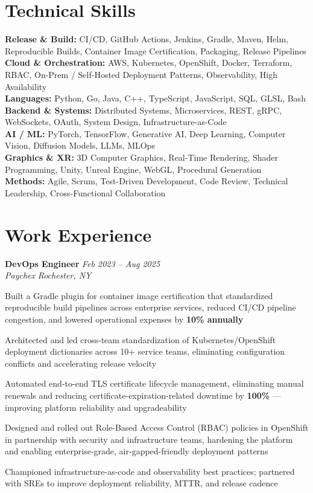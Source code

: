 \documentclass[letterpaper,10pt]{article}
\newcommand{\role}[4]{%
  \textbf{#1} \hfill \textit{#3}\\[-1pt]
  \textit{#2} \hfill \textit{#4}\par\vspace{2pt}
}
\begin{document}
\section*{Technical Skills}
\textbf{Release \& Build:} CI/CD, GitHub Actions, Jenkins, Gradle, Maven, Helm, Reproducible Builds, Container Image Certification, Packaging, Release Pipelines\\
\textbf{Cloud \& Orchestration:} AWS, Kubernetes, OpenShift, Docker, Terraform, RBAC, On-Prem / Self-Hosted Deployment Patterns, Observability, High Availability\\
\textbf{Languages:} Python, Go, Java, C++, TypeScript, JavaScript, SQL, GLSL, Bash\\
\textbf{Backend \& Systems:} Distributed Systems, Microservices, REST, gRPC, WebSockets, OAuth, System Design, Infrastructure-as-Code\\
\textbf{AI / ML:} PyTorch, TensorFlow, Generative AI, Deep Learning, Computer Vision, Diffusion Models, LLMs, MLOps\\
\textbf{Graphics \& XR:} 3D Computer Graphics, Real-Time Rendering, Shader Programming, Unity, Unreal Engine, WebGL, Procedural Generation\\
\textbf{Methods:} Agile, Scrum, Test-Driven Development, Code Review, Technical Leadership, Cross-Functional Collaboration

\section*{Work Experience}
\role{DevOps Engineer}{Paychex}{Feb 2023 -- Aug 2025}{Rochester, NY}
\begin{tightitemize}
  \item Built a Gradle plugin for container image certification that standardized reproducible build pipelines across enterprise services, reduced CI/CD pipeline congestion, and lowered operational expenses by \textbf{10\% annually}
  \item Architected and led cross-team standardization of Kubernetes/OpenShift deployment dictionaries across 10+ service teams, eliminating configuration conflicts and accelerating release velocity
  \item Automated end-to-end TLS certificate lifecycle management, eliminating manual renewals and reducing certificate-expiration-related downtime by \textbf{100\%} — improving platform reliability and upgradeability
  \item Designed and rolled out Role-Based Access Control (RBAC) policies in OpenShift in partnership with security and infrastructure teams, hardening the platform and enabling enterprise-grade, air-gapped-friendly deployment patterns
  \item Championed infrastructure-as-code and observability best practices; partnered with SREs to improve deployment reliability, MTTR, and release cadence
\end{tightitemize}
\end{document}

